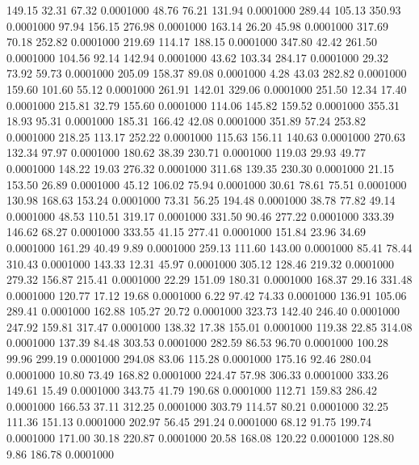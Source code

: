  149.15   32.31   67.32   0.0001000
  48.76   76.21  131.94   0.0001000
 289.44  105.13  350.93   0.0001000
  97.94  156.15  276.98   0.0001000
 163.14   26.20   45.98   0.0001000
 317.69   70.18  252.82   0.0001000
 219.69  114.17  188.15   0.0001000
 347.80   42.42  261.50   0.0001000
 104.56   92.14  142.94   0.0001000
  43.62  103.34  284.17   0.0001000
  29.32   73.92   59.73   0.0001000
 205.09  158.37   89.08   0.0001000
   4.28   43.03  282.82   0.0001000
 159.60  101.60   55.12   0.0001000
 261.91  142.01  329.06   0.0001000
 251.50   12.34   17.40   0.0001000
 215.81   32.79  155.60   0.0001000
 114.06  145.82  159.52   0.0001000
 355.31   18.93   95.31   0.0001000
 185.31  166.42   42.08   0.0001000
 351.89   57.24  253.82   0.0001000
 218.25  113.17  252.22   0.0001000
 115.63  156.11  140.63   0.0001000
 270.63  132.34   97.97   0.0001000
 180.62   38.39  230.71   0.0001000
 119.03   29.93   49.77   0.0001000
 148.22   19.03  276.32   0.0001000
 311.68  139.35  230.30   0.0001000
  21.15  153.50   26.89   0.0001000
  45.12  106.02   75.94   0.0001000
  30.61   78.61   75.51   0.0001000
 130.98  168.63  153.24   0.0001000
  73.31   56.25  194.48   0.0001000
  38.78   77.82   49.14   0.0001000
  48.53  110.51  319.17   0.0001000
 331.50   90.46  277.22   0.0001000
 333.39  146.62   68.27   0.0001000
 333.55   41.15  277.41   0.0001000
 151.84   23.96   34.69   0.0001000
 161.29   40.49    9.89   0.0001000
 259.13  111.60  143.00   0.0001000
  85.41   78.44  310.43   0.0001000
 143.33   12.31   45.97   0.0001000
 305.12  128.46  219.32   0.0001000
 279.32  156.87  215.41   0.0001000
  22.29  151.09  180.31   0.0001000
 168.37   29.16  331.48   0.0001000
 120.77   17.12   19.68   0.0001000
   6.22   97.42   74.33   0.0001000
 136.91  105.06  289.41   0.0001000
 162.88  105.27   20.72   0.0001000
 323.73  142.40  246.40   0.0001000
 247.92  159.81  317.47   0.0001000
 138.32   17.38  155.01   0.0001000
 119.38   22.85  314.08   0.0001000
 137.39   84.48  303.53   0.0001000
 282.59   86.53   96.70   0.0001000
 100.28   99.96  299.19   0.0001000
 294.08   83.06  115.28   0.0001000
 175.16   92.46  280.04   0.0001000
  10.80   73.49  168.82   0.0001000
 224.47   57.98  306.33   0.0001000
 333.26  149.61   15.49   0.0001000
 343.75   41.79  190.68   0.0001000
 112.71  159.83  286.42   0.0001000
 166.53   37.11  312.25   0.0001000
 303.79  114.57   80.21   0.0001000
  32.25  111.36  151.13   0.0001000
 202.97   56.45  291.24   0.0001000
  68.12   91.75  199.74   0.0001000
 171.00   30.18  220.87   0.0001000
  20.58  168.08  120.22   0.0001000
 128.80    9.86  186.78   0.0001000
